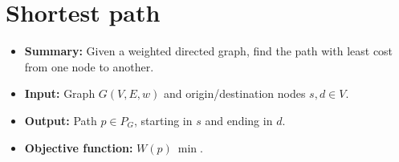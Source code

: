 \section{Shortest path} \label{algorithm-shortestpath}
\begin{itemize}
    \item \textbf{Summary:} Given a weighted directed graph, find the path with least cost from one node to another.
    \item \textbf{Input:} Graph $G(V,E,w)$ and origin/destination nodes $s, d \in V$.
    \item \textbf{Output:} Path $p \in P_G$, starting in $s$ and ending in $d$.
    \item \textbf{Objective function:} $W(p)~\min$.
\end{itemize}


